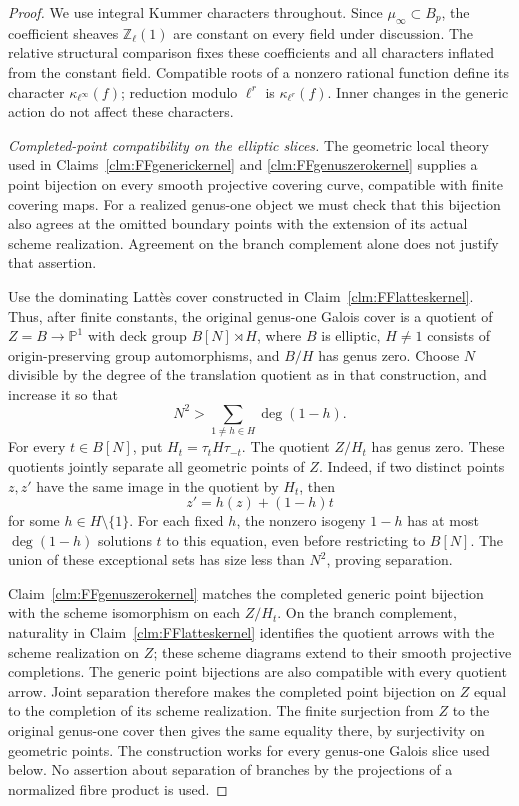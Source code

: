 \documentclass[11pt]{article}
\begin{document}
\begin{proof}
We use integral Kummer characters throughout. Since
\(\mu_\infty\subset B_p\), the coefficient sheaves
\(\mathbb Z_\ell(1)\) are constant on every field
under discussion. The relative structural comparison
fixes these coefficients and all characters inflated
from the constant field. Compatible roots of a
nonzero rational function define its character
\(\kappa_{\ell^\infty}(f)\); reduction modulo
\(\ell^r\) is \(\kappa_{\ell^r}(f)\).
Inner changes in the generic action do not affect
these characters.

\emph{Completed-point compatibility on the elliptic slices.}
The geometric local theory used in
Claims~\ref{clm:FFgenerickernel} and
\ref{clm:FFgenuszerokernel} supplies a point
bijection on every smooth projective covering curve,
compatible with finite covering maps. For a
realized genus-one object we must check that this
bijection also agrees at the omitted boundary points
with the extension of its actual scheme realization.
Agreement on the branch complement alone does not
justify that assertion.

Use the dominating Latt\`es cover constructed in
Claim~\ref{clm:FFlatteskernel}. Thus, after finite
constants, the original genus-one Galois cover is a
quotient of
\(Z=B\to\mathbb P^1\) with deck group
\(B[N]\rtimes H\), where \(B\) is elliptic,
\(H\ne1\) consists of origin-preserving group
automorphisms, and \(B/H\) has genus zero. Choose
\(N\) divisible by the degree of the translation
quotient as in that construction, and increase it
so that
\[
              N^2>\sum_{1\ne h\in H}\deg(1-h).
                                                        \tag{F.49.3}
\]
For every \(t\in B[N]\), put
\(H_t=\tau_tH\tau_{-t}\). The quotient
\(Z/H_t\) has genus zero. These quotients jointly
separate all geometric points of \(Z\). Indeed,
if two distinct points \(z,z'\) have the same
image in the quotient by \(H_t\), then
\[
                  z'=h(z)+(1-h)t
\]
for some \(h\in H\setminus\{1\}\). For each
fixed \(h\), the nonzero isogeny \(1-h\) has
at most \(\deg(1-h)\) solutions \(t\) to this
equation, even before restricting to \(B[N]\).
The union of these exceptional sets has size less
than \(N^2\), proving separation.

Claim~\ref{clm:FFgenuszerokernel} matches the
completed generic point bijection with the scheme
isomorphism on each \(Z/H_t\). On the branch
complement, naturality in
Claim~\ref{clm:FFlatteskernel} identifies the
quotient arrows with the scheme realization on
\(Z\); these scheme diagrams extend to their
smooth projective completions. The generic point
bijections are also compatible with every quotient
arrow. Joint separation therefore makes the
completed point bijection on \(Z\) equal to the
completion of its scheme realization. The finite
surjection from \(Z\) to the original genus-one
cover then gives the same equality there, by
surjectivity on geometric points. The construction
works for every genus-one Galois slice used below.
No assertion about separation of branches by the
projections of a normalized fibre product is used.


\end{proof}
\end{document}
